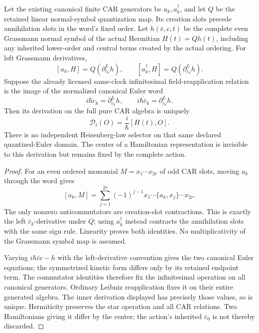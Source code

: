 \documentclass[12pt,a4paper]{article}
\begin{document}
\begin{theorem}
\label{p4:thm:v2190-car-euler-derivation}
Let the existing canonical finite CAR generators be \(a_k,a_k^\dagger\),
and let \(Q\) be the retained linear normal-symbol quantization map.  Its
creation slots precede annihilation slots in the word's fixed order.  Let
\(h(\bar c,c,t)\) be the complete even Grassmann normal symbol of the
actual Hermitian \(H(t)=Qh(t)\), including any inherited lower-order and
central terms created by the actual ordering.  For left Grassmann
derivatives,
\[
 \boxed{[a_k,H]=Q(\partial^L_{\bar c_k}h),\qquad
 [a_k^\dagger,H]=Q(\partial^L_{c_k}h).}
\]
Suppose the already licensed same-clock infinitesimal field-reapplication
relation is the image of the normalized canonical Euler word
\[
 i\hbar\dot c_k=\partial^L_{\bar c_k}h,\qquad
 i\hbar\dot{\bar c}_k=\partial^L_{c_k}h.
\]
Then its derivation on the full pure CAR algebra is uniquely
\[
 \boxed{\mathcal D_t(O)=\frac{i}{\hbar}[H(t),O].}
\]
There is no independent Heisenberg-law selector on that same declared
quantized-Euler domain.  The center of a Hamiltonian representation is
invisible to this derivation but remains fixed by the complete action.
\end{theorem}
\begin{proof}
For an even ordered monomial \(M=x_1\cdots x_{2r}\) of odd CAR slots,
moving \(a_k\) through the word gives
\[
 [a_k,M]=\sum_{j=1}^{2r}(-1)^{j-1}
 x_1\cdots\{a_k,x_j\}\cdots x_{2r}.
\]
The only nonzero anticommutators are creation-slot contractions.  This is
exactly the left \(\bar c_k\)-derivative under \(Q\); using
\(a_k^\dagger\) instead contracts the annihilation slots with the same
sign rule.  Linearity proves both identities.  No multiplicativity of
the Grassmann symbol map is assumed.

Varying \(i\hbar\bar c\dot c-h\) with the left-derivative convention
gives the two canonical Euler equations; the symmetrized kinetic form
differs only by its retained endpoint term.  The commutator identities
therefore fix the infinitesimal operation on all canonical generators.
Ordinary Leibniz reapplication fixes it on their entire generated algebra.
The inner derivation displayed has precisely those values, so is unique.
Hermiticity preserves the star operation and all CAR relations.  Two
Hamiltonians giving it differ by the center; the action's inherited
\(\varepsilon_0\) is not thereby discarded.
\end{proof}
\end{document}

